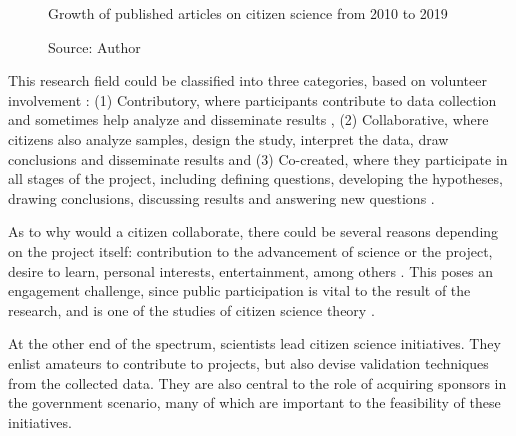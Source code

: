 \begin{figure}[ht]
    \centering
    \caption{Growth of published articles on citizen science from 2010 to 2019}
    \label{fig:growth-publications}
    \caption*{Source: Author}
\end{figure}

This research field could be classified into three categories, based on volunteer involvement \cite{follett2015analysis}: (1) Contributory, where participants contribute to data collection and sometimes help analyze and disseminate results \cite{bonney2009citizen}, (2) Collaborative, where citizens also analyze samples, design the study, interpret the data, draw conclusions and disseminate results \cite{faridani2009networked} and (3) Co-created, where they participate in all stages of the project, including defining questions, developing the hypotheses, drawing conclusions, discussing results and answering new questions \cite{hill2012notes}.

As to why would a citizen collaborate, there could be several reasons depending on the project itself: contribution to the advancement of science or the project, desire to learn, personal interests, entertainment, among others \cite{tinati2016because}. This poses an engagement challenge, since public participation is vital to the result of the research, and is one of the studies of citizen science theory \cite{bowser2013using}.

At the other end of the spectrum, scientists lead citizen science initiatives. They enlist amateurs to contribute to projects, but also devise validation techniques from the collected data. They are also central to the role of acquiring sponsors in the government scenario, many of which are important to the feasibility of these initiatives.

